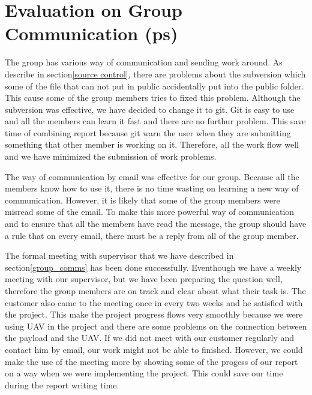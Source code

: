 \section{Evaluation on Group Communication (ps)}
\label{evaluation on group communication}

The group has various way of communication and sending work around.
As describe in section\ref{source control}, there are problems about the subversion which some of the file that can not put in public accidentally put into the public folder.
This cause some of the group members tries to fixed this problem.
Although the subversion was effective, we have decided to change it to git.
Git is easy to use and all the members can learn it fast and there are no furthur problem.
This save time of combining report because git warn the user when they are submitting something that other member is working on it.
Therefore, all the work flow well and we have minimized the submission of work problems.

The way of communication by email was effective for our group.
Because all the members know how to use it, there is no time wasting on learning a new way of communication.
However, it is likely that some of the group members were misread some of the email.
To make this more powerful way of communication and to ensure that all the members have read the message, the group should have a rule that on every email, there must be a reply from all of the group member.

The formal meeting with supervisor that we have described in section\ref{group_comms} has been done successfully. 
Eventhough we have a weekly meeting with our supervisor, but we have been preparing the question well, therefore the group members are on track and clear about what their task is.
The customer also came to the meeting once in every two weeks and he satisfied with the project.
This make the project progress flows very smoothly because we were using UAV in the project and there are some problems on the connection between the payload and the UAV.
If we did not meet with our customer regularly and contact him by email, our work might not be able to finished.
However, we could make the use of the meeting more by showing some of the progess of our report on a way when we were implementing the project.
This could save our time during the report writing time.

